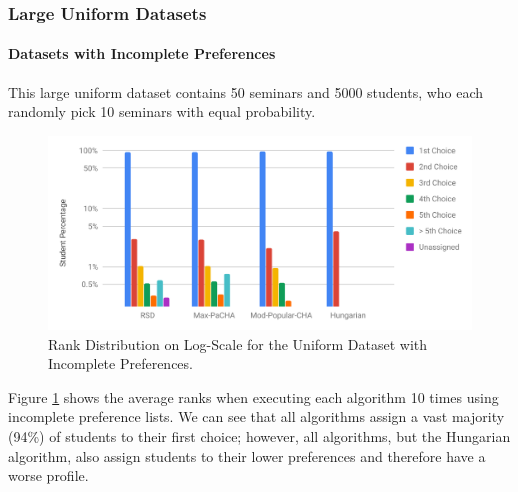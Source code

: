 \subsubsection{Large Uniform Datasets}

\paragraph{Datasets with Incomplete Preferences}
This large uniform dataset contains 50 seminars and 5000 students, who each randomly pick 10 seminars with equal probability.

\begin{figure}[h!]
  \centering
    \includegraphics[width=0.75\linewidth]{assets/plots/uniform_incompl_distr.pdf}
    \caption{Rank Distribution on Log-Scale for the Uniform Dataset with Incomplete Preferences.}
    \label{fig:uniform-incomplete-distribution}
\end{figure}

Figure \ref{fig:uniform-incomplete-distribution} shows the average ranks when executing each algorithm 10 times using incomplete preference lists. We can see that all algorithms assign a vast majority (94\%) of students to their first choice; however, all algorithms, but the Hungarian algorithm, also assign students to their lower preferences and therefore have a worse profile.

\begin{table}[h!]
  \centering
  \caption{Average Results for the Large Uniform Datasets with Incomplete Preferences.}
  \label{tab:results-uniform-large}
\end{table}

